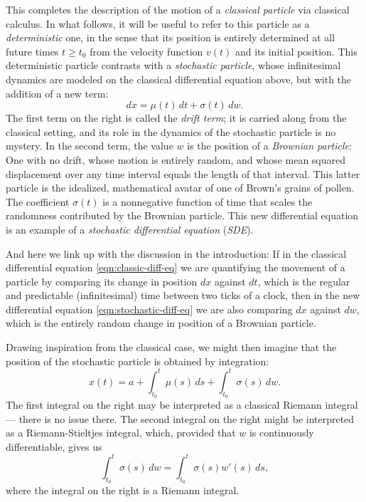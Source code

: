 \documentclass[11pt]{book}
\theoremstyle{definition}
\numberwithin{equation}{section}
\begin{document}
This completes the description of the motion of a \textit{classical particle} via classical calculus. In what follows, it will be useful to refer to this particle as a \textit{deterministic} one, in the sense that its position is entirely determined at all future times $t\geq t_0$ from the velocity function $v(t)$ and its initial position. This deterministic particle contrasts with a \textit{stochastic particle}, whose infinitesimal dynamics are modeled on the classical differential equation above, but with the addition of a new term:
\begin{equation} \label{eqn:stochastic-diff-eq}
	dx = \mu(t) \, dt + \sigma(t) \, dw.
\end{equation}
The first term on the right is called the \textit{drift term}; it is carried along from the classical setting, and its role in the dynamics of the stochastic particle is no mystery. In the second term, the value $w$ is the position of a \textit{Brownian particle}: One with no drift, whose motion is entirely random, and whose mean squared displacement over any time interval equals the length of that interval. This latter particle is the idealized, mathematical avatar of one of Brown's grains of pollen. The coefficient $\sigma(t)$ is a nonnegative function of time that scales the randomness contributed by the Brownian particle. This new differential equation is an example of a \textit{stochastic differential equation} (\textit{SDE}).

And here we link up with the discussion in the introduction: If in the classical differential equation \eqref{eqn:classic-diff-eq} we are quantifying the movement of a particle by comparing its change in position $dx$ against $dt$, which is the regular and predictable (infinitesimal) time between two ticks of a clock, then in the new differential equation \eqref{eqn:stochastic-diff-eq} we are also comparing $dx$ against $dw$, which is the entirely random change in position of a Brownian particle.

Drawing inspiration from the classical case, we might then imagine that the position of the stochastic particle is obtained by integration:
\begin{equation} \label{eqn:sde-solution}
	x(t) = a + \int_{t_0}^t \mu(s) \, ds + \int_{t_0}^t \sigma(s) \, dw.
\end{equation}
The first integral on the right may be interpreted as a classical Riemann integral --- there is no issue there. The second integral on the right might be interpreted as a Riemann-Stieltjes integral, which, provided that $w$ is continuously differentiable, gives us
\begin{equation} \label{eqn:wrong-ito-integral}
	\int_{t_0}^t \sigma(s) \, dw = \int_{t_0}^t \sigma(s) w'(s) \, ds,
\end{equation}
where the integral on the right is a Riemann integral.
\end{document}
